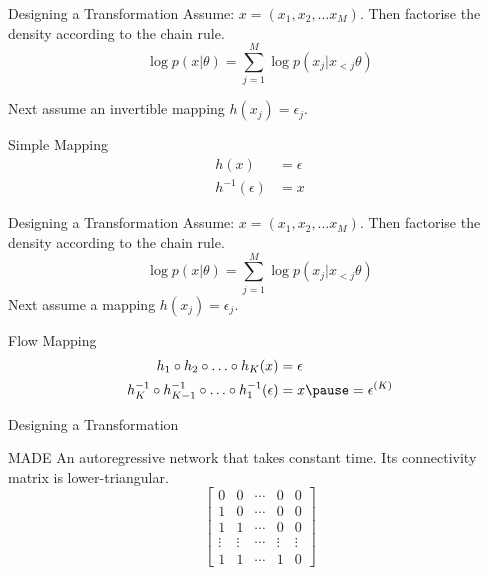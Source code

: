 \begin{frame}{Designing a Transformation}
Assume: $ x = (x_{1}, x_{2}, \ldots x_{M}) $.
Then factorise the density according to the chain rule.
\begin{equation*}
\log p(x|\theta) = \sum_{j=1}^{M} \log p(x_{j}|x_{<j}\theta)
\end{equation*}
\pause

Next assume an invertible mapping $ h(x_{j}) = \epsilon_{j} $.
\begin{block}{Simple Mapping}
\begin{equation*}
\begin{aligned}
h(x) &= \epsilon \\
h^{-1}(\epsilon) &= x
\end{aligned}
\end{equation*}
\end{block}
\end{frame}

\begin{frame}{Designing a Transformation}
Assume: $ x = (x_{1}, x_{2}, \ldots x_{M}) $.
Then factorise the density according to the chain rule.
\begin{equation*}
\log p(x|\theta) = \sum_{j=1}^{M} \log p(x_{j}|x_{<j}\theta)
\end{equation*}
Next assume a mapping $ h(x_{j}) = \epsilon_{j} $.
\begin{block}{Flow Mapping}
\begin{equation*}
\begin{aligned}
h_{1}\circ h_{2} \circ\ldots\circ h_{K}(x) &= \epsilon \\
h^{-1}_{K}\circ h^{-1}_{K-1}\circ\ldots \circ h^{-1}_{1}(\epsilon) &= x \pause = \epsilon^{(K)}
\end{aligned}
\end{equation*}
\end{block}
\end{frame}

\begin{frame}{Designing a Transformation}
\begin{block}{MADE \citep{GermainEtAl:2015}}
An autoregressive network that takes constant time. Its connectivity matrix is lower-triangular.
\begin{equation*}
\begin{bmatrix}
0 & 0 & \cdots & 0 & 0 \\
1 & 0 & \cdots & 0 & 0 \\
1 & 1 & \cdots & 0 & 0 \\
\vdots & \vdots & \cdots & \vdots & \vdots \\
1 & 1 & \cdots & 1 & 0
\end{bmatrix}
\end{equation*}
\end{block}
\end{frame}

